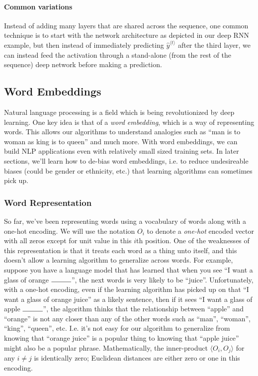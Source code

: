 \documentclass[12pt]{article}
\begin{document}
\paragraph{Common variations} Instead of adding many layers that are shared across the sequence, one common technique is to start with the network architecture as depicted in our deep RNN example, but then instead of immediately predicting $\hat y^{\langle t \rangle }$ after the third layer, we can instead feed the activation through a stand-alone (from the rest of the sequence) deep network before making a prediction.

\subsection{Word Embeddings}
Natural language processing is a field which is being revolutionized by deep learning. One key idea is that of a \emph{word embedding}, which is a way of representing words. This allows our algorithms to understand analogies such as ``man is to woman as king is to queen'' and much more. With word embeddings, we can build NLP applications even with relatively small sized training sets. In later sections, we'll learn how to de-bias word embeddings, i.e. to reduce undesireable biases (could be gender or ethnicity, etc.) that learning algorithms can sometimes pick up.

\subsubsection{Word Representation}
So far, we've been representing words using a vocabulary of words along with a one-hot encoding. We will use the notation $O_i$ to denote a \emph{one-hot} encoded vector with all zeros except for unit value in this $i$th position.
One of the weaknesses of this representation is that it treats each word
as a thing unto itself, and this doesn't allow a learning algorithm to generalize across words. For example, suppose you have a language model that has learned that when you see ``I want a glass of orange $\rule{1cm}{0.15mm}$'', the next words is very likely to be ``juice''. Unfortunately, with a one-hot encoding, even if the learning algorithm has picked up on that ``I want a glass of orange juice'' as a likely sentence, then if it sees ``I want a glass of apple $\rule{1cm}{0.15mm}$'', the algorithm thinks that the relationship between ``apple'' and ``orange'' is not any closer than any of the other words such as ``man'', ``woman'', ``king'', ``queen'', etc. I.e. it's not easy for our algorithm to generalize from knowing that ``orange juice'' is a popular thing to knowing that ``apple juice'' might also be a popular phrase. Mathematically, the inner-product $\langle O_i, O_j \rangle$ for any $i \neq j$ is identically zero; Euclidean distances are either zero or one in this encoding.
\end{document}
